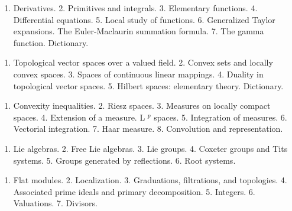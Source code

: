 
\begin{enumerate}
\def\labelenumi{\arabic{enumi}.}
\tightlist
\item
  Derivatives. 2. Primitives and integrals. 3. Elementary functions. 4. Differential equations. 5. Local study of functions. 6. Generalized Taylor expansions. The Euler-Maclaurin summation formula. 7. The gamma function. Dictionary.
\end{enumerate}


\begin{enumerate}
\def\labelenumi{\arabic{enumi}.}
\tightlist
\item
  Topological vector spaces over a valued field. 2. Convex sets and locally convex spaces. 3. Spaces of continuous linear mappings. 4. Duality in topological vector spaces. 5. Hilbert spaces: elementary theory. Dictionary.
\end{enumerate}


\begin{enumerate}
\def\labelenumi{\arabic{enumi}.}
\tightlist
\item
  Convexity inequalities. 2. Riesz spaces. 3. Measures on locally compact spaces. 4. Extension of a measure. L \(^{p}\) spaces. 5. Integration of measures. 6. Vectorial integration. 7. Haar measure. 8. Convolution and representation.
\end{enumerate}


\begin{enumerate}
\def\labelenumi{\arabic{enumi}.}
\tightlist
\item
  Lie algebras. 2. Free Lie algebras. 3. Lie groups. 4. Coxeter groups and Tits systems. 5. Groups generated by reflections. 6. Root systems.
\end{enumerate}


\begin{enumerate}
\def\labelenumi{\arabic{enumi}.}
\tightlist
\item
  Flat modules. 2. Localization. 3. Graduations, filtrations, and topologies. 4. Associated prime ideals and primary decomposition. 5. Integers. 6. Valuations. 7. Divisors.
\end{enumerate}

